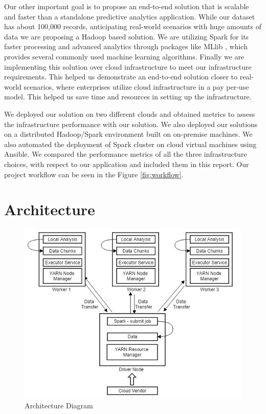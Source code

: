 \documentclass[9pt,twocolumn,twoside]{styles/osajnl}
\begin{document}
Our other important goal is to propose an end-to-end solution that is scalable and faster than a standalone predictive analytics application. While our dataset has about 100,000 records, anticipating real-world scenarios with huge amounts of data we are proposing a Hadoop based solution. We are utilizing Spark for its faster processing \cite{www-sparkfast} and  advanced analytics through packages like MLlib \cite{www-mllib}, which provides several commonly used machine learning algorithms. Finally we are implementing this solution over cloud infrastructure to meet our infrastructure requirements. This helped us demonstrate an end-to-end solution closer to real-world scenarios, where enterprises utilize cloud infrastructure in a pay per-use model. This helped us save time and resources in setting up the infrastructure.

We deployed our solution on two different clouds and obtained metrics to assess the infrastructure performance with our solution.  We also deployed our solutions on a distributed Hadoop/Spark environment built on on-premise machines. We also automated the deployment of Spark cluster on cloud virtual machines using Ansible. We compared the performance metrics of all the three infrastructure choices, with respect to our application and included them in this report. Our project workflow can be seen in the Figure \ref{fig:workflow}.

\section{Architecture}

\begin{figure}[h]
\centering
\includegraphics[width=\linewidth]{images/Architecture_Diagram}
\caption{Architecture Diagram}
\label{fig:arch}
\end{figure}
\end{document}

